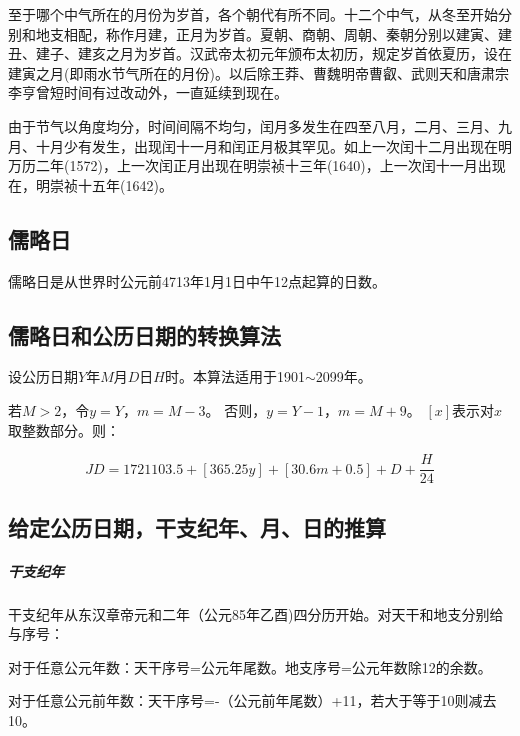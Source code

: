 至于哪个中气所在的月份为岁首，各个朝代有所不同。十二个中气，从冬至开始分别和地支相配，称作月建，正月为岁首。夏朝、商朝、周朝、秦朝分别以建寅、建丑、建子、建亥之月为岁首。汉武帝太初元年颁布太初历，规定岁首依夏历，设在建寅之月(即雨水节气所在的月份)。以后除王莽、曹魏明帝曹叡、武则天和唐肃宗李亨曾短时间有过改动外，一直延续到现在。

由于节气以角度均分，时间间隔不均匀，闰月多发生在四至八月，二月、三月、九月、十月少有发生，出现闰十一月和闰正月极其罕见。如上一次闰十二月出现在明万历二年(1572)，上一次闰正月出现在明崇祯十三年(1640)，上一次闰十一月出现在，明崇祯十五年(1642)。

\subsection{儒略日}
儒略日是从世界时公元前4713年1月1日中午12点起算的日数。

\subsection{儒略日和公历日期的转换算法}
设公历日期$Y$年$M$月$D$日$H$时。本算法适用于1901$\sim$2099年。

若$M>2$，令$y=Y$，$m=M-3$。
否则，$y=Y-1$，$m=M+9$。
$\left[x\right]$表示对$x$取整数部分。则：

\begin{equation}
	JD=1721103.5+\left[365.25y\right]+\left[30.6m+0.5\right]+D+\frac{H}{24}
\end{equation}
\subsection{给定公历日期，干支纪年、月、日的推算}
\subparagraph{干支纪年}
干支纪年从东汉章帝元和二年（公元85年乙酉)四分历开始。对天干和地支分别给与序号：

对于任意公元年数：天干序号=公元年尾数。地支序号=公元年数除12的余数。

对于任意公元前年数：天干序号=-（公元前年尾数）+11，若大于等于10则减去10。

